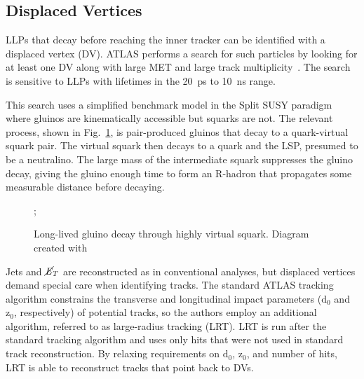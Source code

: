 \documentclass[12pt]{article}
\begin{document}
    \subsection{Displaced Vertices}
        LLPs that decay before reaching the inner tracker can be identified with a displaced vertex (DV). ATLAS performs a search for such particles by looking for at least one DV along with large MET and large track multiplicity~\cite{atlas_displaced}. The search is sensitive to LLPs with lifetimes in the \SI{20}{\pico\s} to \SI{10}{\nano\s} range.

        This search uses a simplified benchmark model in the Split SUSY paradigm where gluinos are kinematically accessible but squarks are not. The relevant process, shown in Fig.~\ref{displaced_process}, is pair-produced gluinos that decay to a quark-virtual squark pair. The virtual squark then decays to a quark and the LSP, presumed to be a neutralino. The large mass of the intermediate squark suppresses the gluino decay, giving the gluino enough time to form an R-hadron that propagates some measurable distance before decaying. 

        \noindent \begin{figure}[htbp] \begin{center}
        ;
        \caption{Long-lived gluino decay through highly virtual squark. Diagram created with~\cite{tikz}}
        \label{displaced_process}
        \end{center} \end{figure}

        Jets and $\cancel{\it{E}}_{T}$ are reconstructed as in conventional analyses, but displaced vertices demand special care when identifying tracks. The standard ATLAS tracking algorithm constrains the transverse and longitudinal impact parameters ($\mathrm{d}_0$ and $\mathrm{z}_0$, respectively) of potential tracks, so the authors employ an additional algorithm, referred to as large-radius tracking (LRT). LRT is run after the standard tracking algorithm and uses only hits that were not used in standard track reconstruction. By relaxing requirements on $\mathrm{d}_0$, $\mathrm{z}_0$, and number of hits, LRT is able to reconstruct tracks that point back to DVs.
        
\end{document}
